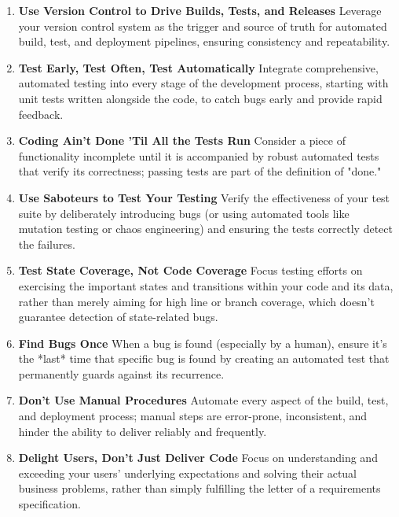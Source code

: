 \documentclass[11pt]{article}
\begin{document}
\begin{tcolorbox}[pragchapterbox={Chapter 9: Pragmatic Projects}]
\begin{multicols}{2}
\begin{enumerate}[label=\arabic*., start=82, itemsep=0.8ex, %
                  topsep=0pt, partopsep=0pt, labelwidth=!, labelindent=0pt, leftmargin=*]
    \item \textbf{Use Version Control to Drive Builds, Tests, and Releases}
    Leverage your version control system as the trigger and source of truth for automated build, test, and deployment pipelines, ensuring consistency and repeatability.

    \item \textbf{Test Early, Test Often, Test Automatically}
    Integrate comprehensive, automated testing into every stage of the development process, starting with unit tests written alongside the code, to catch bugs early and provide rapid feedback.

    \item \textbf{Coding Ain't Done 'Til All the Tests Run} %
    Consider a piece of functionality incomplete until it is accompanied by robust automated tests that verify its correctness; passing tests are part of the definition of "done."

    \item \textbf{Use Saboteurs to Test Your Testing} %
    Verify the effectiveness of your test suite by deliberately introducing bugs (or using automated tools like mutation testing or chaos engineering) and ensuring the tests correctly detect the failures.

    \item \textbf{Test State Coverage, Not Code Coverage} %
    Focus testing efforts on exercising the important states and transitions within your code and its data, rather than merely aiming for high line or branch coverage, which doesn't guarantee detection of state-related bugs.

    \item \textbf{Find Bugs Once} %
    When a bug is found (especially by a human), ensure it's the *last* time that specific bug is found by creating an automated test that permanently guards against its recurrence.

    \item \textbf{Don't Use Manual Procedures} %
    Automate every aspect of the build, test, and deployment process; manual steps are error-prone, inconsistent, and hinder the ability to deliver reliably and frequently.

    \item \textbf{Delight Users, Don't Just Deliver Code} %
    Focus on understanding and exceeding your users' underlying expectations and solving their actual business problems, rather than simply fulfilling the letter of a requirements specification.


\end{enumerate}
\end{multicols}
\end{tcolorbox}
\end{document}
